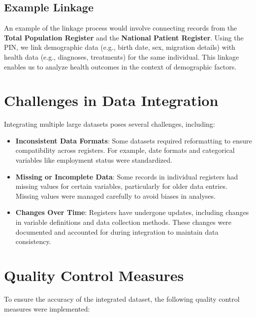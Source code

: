\documentclass[
]{book}
\providecommand{\tightlist}{%
  \setlength{\itemsep}{0pt}\setlength{\parskip}{0pt}}
\begin{document}
\hypertarget{example-linkage}{%
\subsection{Example Linkage}\label{example-linkage}}

An example of the linkage process would involve connecting records from the \textbf{Total Population Register} and the \textbf{National Patient Register}. Using the PIN, we link demographic data (e.g., birth date, sex, migration details) with health data (e.g., diagnoses, treatments) for the same individual. This linkage enables us to analyze health outcomes in the context of demographic factors.

\hypertarget{challenges-in-data-integration}{%
\section{Challenges in Data Integration}\label{challenges-in-data-integration}}

Integrating multiple large datasets poses several challenges, including:

\begin{itemize}
\tightlist
\item
  \textbf{Inconsistent Data Formats}: Some datasets required reformatting to ensure compatibility across registers. For example, date formats and categorical variables like employment status were standardized.
\item
  \textbf{Missing or Incomplete Data}: Some records in individual registers had missing values for certain variables, particularly for older data entries. Missing values were managed carefully to avoid biases in analyses.
\item
  \textbf{Changes Over Time}: Registers have undergone updates, including changes in variable definitions and data collection methods. These changes were documented and accounted for during integration to maintain data consistency.
\end{itemize}

\hypertarget{quality-control-measures}{%
\section{Quality Control Measures}\label{quality-control-measures}}

To ensure the accuracy of the integrated dataset, the following quality control measures were implemented:
\end{document}
